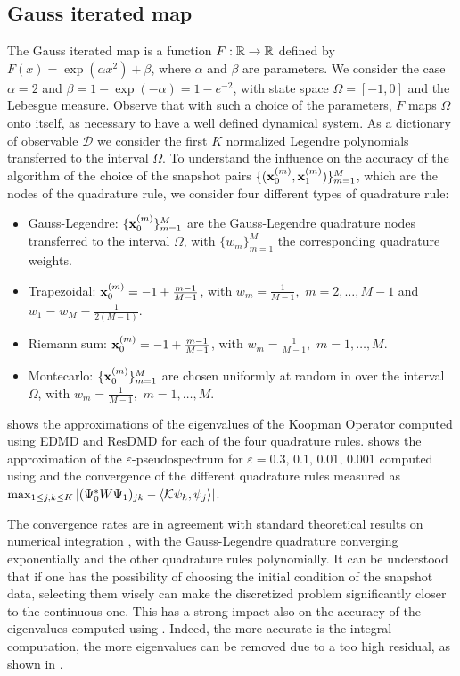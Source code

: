 \subsection{Gauss iterated map}
The Gauss iterated map is a function $F:\mathbb{R}\to\mathbb{R}$ defined by $F(x) =\exp(\alpha x^2) + \beta $, where $\alpha$ and $\beta$ are parameters. We consider the case $\alpha = 2$ and $\beta = 1-\exp(-\alpha) = 1 - e^{-2}$, with state space $\Omega = [-1, 0]$ and the Lebesgue measure. Observe that with such a choice of the parameters, $F$ maps $\Omega$ onto itself, as necessary to have a well defined dynamical system. As a dictionary of observable $\mathcal{D}$ we consider the first $K$ normalized Legendre polynomials transferred to the interval $\Omega$. To understand the influence on the accuracy of the algorithm of the choice of the snapshot pairs $\{(\vb{x}_0^{(m)}, \vb{x}_1^{(m)})\}_{m = 1}^M$, which are the nodes of the quadrature rule, we consider four different types of quadrature rule:
\begin{itemize}
    \item Gauss-Legendre: $\{\vb{x}_0^{(m)}\}_{m = 1}^M$ are the Gauss-Legendre quadrature nodes transferred to the interval $\Omega$, with $\{w_m\}_{m = 1}^M$ the corresponding quadrature weights.
    \item Trapezoidal: $\vb{x}_0^{(m)} = -1 + \frac{m-1}{M-1}$, with $w_m = \frac{1}{M-1},\,\,m = 2,\dots, M-1$ and $w_1 = w_M = \frac{1}{2(M-1)}$.
    \item Riemann sum: $\vb{x}_0^{(m)} = -1 + \frac{m-1}{M-1}$, with $w_m = \frac{1}{M-1},\,\,m = 1,\dots, M$.
    \item Montecarlo: $\{\vb{x}_0^{(m)}\}_{m = 1}^M$ are chosen uniformly at random in over the interval $\Omega$, with $w_m = \frac{1}{M-1},\,\,m = 1,\dots, M$. 
\end{itemize}

 shows the approximations of the eigenvalues of the Koopman Operator computed using EDMD and ResDMD for each of the four quadrature rules.  shows the approximation of the $\varepsilon$-pseudospectrum for $\varepsilon = 0.3,\,0.1,\,0.01,\,0.001$ computed using  and the convergence of the different quadrature rules measured as $\max_{1\leq j,k \leq K} \abs{(\Psi_0^* W \Psi_1)_{jk} - \langle\mathcal{K}\psi_k, \psi_j\rangle}$.

The convergence rates are in agreement with standard theoretical results on numerical integration \cite{quarteroni_numerical_2007}, with the Gauss-Legendre quadrature converging exponentially and the other quadrature rules polynomially. It can be understood that if one has the possibility of choosing the initial condition of the snapshot data, selecting them wisely can make the discretized problem significantly closer to the continuous one. This has a strong impact also on the accuracy of the eigenvalues computed using . Indeed, the more accurate is the integral computation, the more eigenvalues can be removed due to a too high residual, as shown in .

